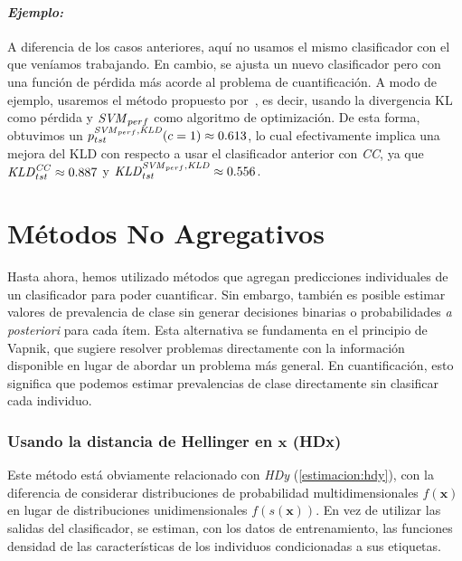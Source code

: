 \paragraph{\it Ejemplo:\/} A diferencia de los casos anteriores, aquí no usamos
el mismo clasificador con el que veníamos trabajando. En cambio, se ajusta un
nuevo clasificador pero con una función de pérdida más acorde al problema de
cuantificación. A modo de ejemplo, usaremos el método propuesto
por~\citet{esuli2010sentiment}, es decir, usando la divergencia KL como pérdida
y \({\it SVM \/}_{perf}\) como algoritmo de optimización. De esta forma,
obtuvimos un \(p^{{\it SVM \/}_{perf}, {\it KLD \/}}_{tst}(c=1) \approx 0.613\),
lo cual efectivamente implica una mejora del KLD con respecto a usar el
clasificador anterior con {\it CC}, ya que \({\it KLD \/}^{\it CC\/}_{tst}
\approx 0.887\) y \({\it KLD \/}^{{\it SVM \/}_{perf}, {\it KLD \/}}_{tst}
\approx 0.556\).

\section{Métodos No Agregativos}\label{estimacion:no_agregativos}

Hasta ahora, hemos utilizado métodos que agregan predicciones individuales de un
clasificador para poder cuantificar. Sin embargo, también es posible estimar
valores de prevalencia de clase sin generar decisiones binarias o probabilidades
{\it a posteriori\/} para cada ítem. Esta alternativa se fundamenta en el
principio de Vapnik, que sugiere resolver problemas directamente con la
información disponible en lugar de abordar un problema más general. En
cuantificación, esto significa que podemos estimar prevalencias de clase
directamente sin clasificar cada individuo.

\subsubsection{Usando la distancia de Hellinger en \(\boldsymbol{x}\)
(HDx)}\label{estimacion:hdx}

Este método está obviamente relacionado con {\it HDy\/} (\ref{estimacion:hdy}), con
la diferencia de considerar distribuciones de probabilidad multidimensionales
\(f(\boldsymbol{x})\) en lugar de distribuciones unidimensionales
\(f(s(\boldsymbol{x}))\). En vez de utilizar las salidas del clasificador, se
estiman, con los datos de entrenamiento, las funciones densidad de las
características de los individuos condicionadas a sus etiquetas.

